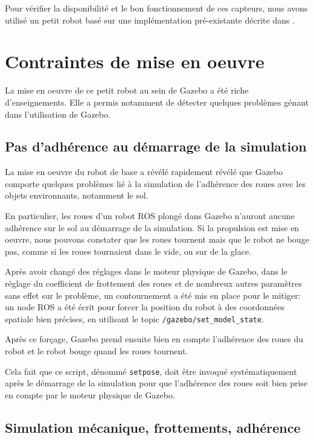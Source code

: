 \documentclass[12pt,a4paper]{report}
\begin{document}
		\para Pour vérifier la disponibilité et le bon fonctionnement de ces capteurs, nous avons utilisé un petit robot basé sur une implémentation pré-existante décrite dans .
		
		

		
\section{Contraintes de mise en oeuvre}
	
	\para La mise en oeuvre de ce petit robot au sein de Gazebo a été riche d'enseignements. Elle a permis notamment de détecter quelques problèmes génant dans l'utilisation de Gazebo.
	
		\subsection{Pas d'adhérence au démarrage de la simulation}
		
		La mise en oeuvre du robot de base a révélé rapidement révélé que Gazebo comporte quelques problèmes  lié à la simulation de l'adhérence des roues avec les objets environnants, notamment le sol.
		
		\para En particulier, les roues d'un robot ROS plongé dans Gazebo n'auront aucune adhérence sur le sol au démarrage de la simulation. Si la propulsion est mise en oeuvre, nous pouvons constater que les roues tournent mais que le robot ne bouge pas, comme si les roues tournaient dans le vide, ou sur de la glace.
		
		\para Après avoir changé des réglages dans le moteur physique de Gazebo, dans le réglage du coefficient de frottement des roues et de nombreux autres paramètres sans effet sur le problème, un contournement a été mis en place pour le mitiger: un node ROS a été écrit pour forcer la position du robot à des coordonnées spatiale bien précises, en utilisant le topic \verb|/gazebo/set_model_state|.
		
		\para Après ce forçage, Gazebo prend ensuite bien en compte l'adhérence des roues du robot et le robot bouge quand les roues tournent. 
		
		\para Cela fait que ce script, dénommé \verb|setpose|, doit être invoqué systématiquement après le démarrage de la simulation pour que l'adhérence des roues soit bien prise en compte par le moteur physique de Gazebo.
		
		\subsection{Simulation mécanique, frottements, adhérence}
		
\end{document}
